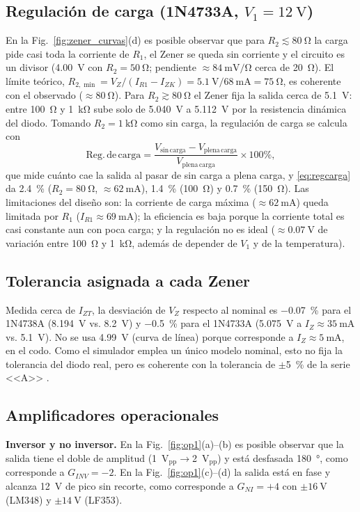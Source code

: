 \documentclass[9pt, conference]{IEEEtran}
\newcommand{\qV}[1]{\SI{#1}{\volt}}
\newcommand{\qmA}[1]{\SI{#1}{\milli\ampere}}
\newcommand{\qohm}[1]{\SI{#1}{\ohm}}
\newcommand{\qkohm}[1]{\SI{#1}{\kilo\ohm}}
\newcommand{\qVpp}[1]{\SI{#1}{\volt}$_{\mathrm{pp}}$}
\newcommand{\pct}[1]{\SI{#1}{\percent}}
\begin{document}
\subsection{Regulación de carga (1N4733A, $V_1=\qV{12}$)}
En la Fig.~\ref{fig:zener_curvas}(d) es posible observar que para $R_2\lesssim\qohm{80}$ la carga pide casi toda la corriente de $R_1$, el Zener se queda sin corriente y el circuito es un divisor (\qV{4.00} con $R_2=\qohm{50}$; pendiente $\approx\SI{84}{\milli\volt\per\ohm}$ cerca de \qohm{20}). El límite teórico, $R_{2,\min}=V_Z/(I_{R1}-I_{ZK})=\qV{5.1}/\qmA{68}=\qohm{75}$, es coherente con el observado ($\approx\qohm{80}$). Para $R_2\gtrsim\qohm{80}$ el Zener fija la salida cerca de \qV{5.1}: entre \qohm{100} y \qkohm{1} sube solo de \qV{5.040} a \qV{5.112} por la resistencia dinámica del diodo. Tomando $R_2=\qkohm{1}$ como sin carga, la regulación de carga se calcula con
\begin{equation}
\mathrm{Reg.\,de\,carga}=\frac{V_{\mathrm{sin\,carga}}-V_{\mathrm{plena\,carga}}}{V_{\mathrm{plena\,carga}}}\times100\%,
\label{eq:regcarga}
\end{equation}
que mide cuánto cae la salida al pasar de sin carga a plena carga, y \eqref{eq:regcarga} da \pct{2.4} ($R_2=\qohm{80}$, $\approx\qmA{62}$), \pct{1.4} (\qohm{100}) y \pct{0.7} (\qohm{150}). Las limitaciones del diseño son: la corriente de carga máxima ($\approx\qmA{62}$) queda limitada por $R_1$ ($I_{R1}\approx\qmA{69}$); la eficiencia es baja porque la corriente total es casi constante aun con poca carga; y la regulación no es ideal ($\approx\qV{0.07}$ de variación entre \qohm{100} y \qkohm{1}, además de depender de $V_1$ y de la temperatura).

\subsection{Tolerancia asignada a cada Zener}
Medida cerca de $I_{ZT}$, la desviación de $V_Z$ respecto al nominal es \pct{-0.07} para el 1N4738A (\qV{8.194} vs. \qV{8.2}) y \pct{-0.5} para el 1N4733A (\qV{5.075} a $I_Z\approx\qmA{35}$ vs. \qV{5.1}). No se usa \qV{4.99} (curva de línea) porque corresponde a $I_Z\approx\qmA{5}$, en el codo. Como el simulador emplea un único modelo nominal, esto no fija la tolerancia del diodo real, pero es coherente con la tolerancia de $\pm$\pct{5} de la serie <<A>> \cite{fairchild}.

\subsection{Amplificadores operacionales}
\textbf{Inversor y no inversor.} En la Fig.~\ref{fig:op1}(a)--(b) es posible observar que la salida tiene el doble de amplitud (\qVpp{1}$\rightarrow$\qVpp{2}) y está desfasada \SI{180}{\degree}, como corresponde a $G_{INV}=-2$. En la Fig.~\ref{fig:op1}(c)--(d) la salida está en fase y alcanza \qV{12} de pico sin recorte, como corresponde a $G_{NI}=+4$ con $\pm\qV{16}$ (LM348) y $\pm\qV{14}$ (LF353).
\end{document}
